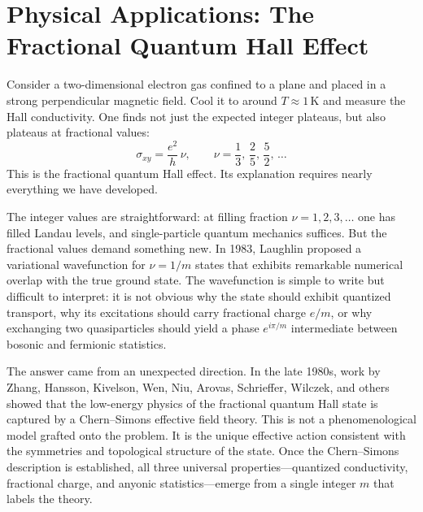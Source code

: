 
\section{Physical Applications: The Fractional Quantum Hall Effect}

Consider a two-dimensional electron gas confined to a plane and placed in a strong perpendicular magnetic field. Cool it to around $T\approx 1\,\text{K}$ and measure the Hall conductivity. One finds not just the expected integer plateaus, but also plateaus at fractional values:
\begin{equation}
  \sigma_{xy}
  =
  \frac{e^2}{h}\,\nu,
  \qquad
  \nu = \frac{1}{3},\,\frac{2}{5},\,\frac{5}{2},\,\ldots
  \label{eq:fqhe-conductance}
\end{equation}
This is the fractional quantum Hall effect. Its explanation requires nearly everything we have developed.

The integer values are straightforward: at filling fraction $\nu=1,2,3,\ldots$ one has filled Landau levels, and single-particle quantum mechanics suffices. But the fractional values demand something new. In 1983, Laughlin proposed a variational wavefunction for $\nu=1/m$ states that exhibits remarkable numerical overlap with the true ground state. The wavefunction is simple to write but difficult to interpret: it is not obvious why the state should exhibit quantized transport, why its excitations should carry fractional charge $e/m$, or why exchanging two quasiparticles should yield a phase $e^{i\pi/m}$ intermediate between bosonic and fermionic statistics.

The answer came from an unexpected direction. In the late 1980s, work by Zhang, Hansson, Kivelson, Wen, Niu, Arovas, Schrieffer, Wilczek, and others showed that the low-energy physics of the fractional quantum Hall state is captured by a Chern--Simons effective field theory. This is not a phenomenological model grafted onto the problem. It is the unique effective action consistent with the symmetries and topological structure of the state. Once the Chern--Simons description is established, all three universal properties---quantized conductivity, fractional charge, and anyonic statistics---emerge from a single integer $m$ that labels the theory.

